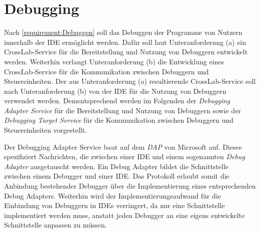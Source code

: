 \section{Debugging}\label{section:konzeption:debugging}

Nach \autoref{requirement:Debuggen} soll das Debuggen der Programme von Nutzern innerhalb der IDE ermöglicht werden. Dafür soll laut Unteranforderung (a) ein CrossLab-Service für die Bereitstellung und Nutzung von Debuggern entwickelt werden. Weiterhin verlangt Unteranforderung (b) die Entwicklung eines CrossLab-Service für die Kommunikation zwischen Debuggern und Steuereinheiten. Der aus Unteranforderung (a) resultierende CrossLab-Service soll nach Unteranforderung (b) von der IDE für die Nutzung von Debuggern verwendet werden. Dementsprechend werden im Folgenden der \textit{Debugging Adapter Service} für die Bereitstellung und Nutzung von Debuggern sowie der \textit{Debugging Target Service} für die Kommunikation zwischen Debuggern und Steuereinheiten vorgestellt.

Der Debugging Adapter Service baut auf dem \textit{\ac{DAP}} \cite{noauthor_debug-adapter-protocol_nodate} von Microsoft auf. Dieses spezifiziert Nachrichten, die zwischen einer IDE und einem sogenannten \textit{Debug Adapter} ausgetauscht werden. Ein Debug Adapter bildet die Schnittstelle zwischen einem Debugger und einer IDE. Das Protokoll erlaubt somit die Anbindung bestehender Debugger über die Implementierung eines entsprechenden Debug Adapters. Weiterhin wird der Implementierungsaufwand für die Einbindung von Debuggern in IDEs verringert, da nur eine Schnittstelle implementiert werden muss, anstatt jeden Debugger an eine eigens entwickelte Schnittstelle anpassen zu müssen.

